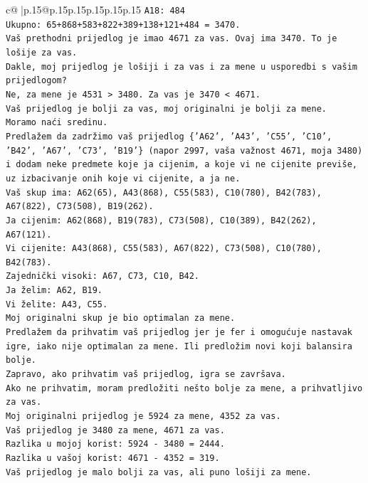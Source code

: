 \documentclass{article}
\begin{document}
{\begin{supertabular}{c@{$\;$}|p{.15\linewidth}@{}p{.15\linewidth}p{.15\linewidth}p{.15\linewidth}p{.15\linewidth}p{.15\linewidth}}
{{{\texttt{A18: 484} \\
\texttt{Ukupno: 65+868+583+822+389+138+121+484 = 3470.} \\
\texttt{Vaš prethodni prijedlog je imao 4671 za vas. Ovaj ima 3470. To je lošije za vas.} \\
\texttt{Dakle, moj prijedlog je lošiji i za vas i za mene u usporedbi s vašim prijedlogom?} \\
\texttt{Ne, za mene je 4531 > 3480. Za vas je 3470 < 4671.} \\
\texttt{Vaš prijedlog je bolji za vas, moj originalni je bolji za mene.} \\
\texttt{Moramo naći sredinu.} \\
\texttt{Predlažem da zadržimo vaš prijedlog \{'A62', 'A43', 'C55', 'C10', 'B42', 'A67', 'C73', 'B19'\} (napor 2997, vaša važnost 4671, moja 3480) i dodam neke predmete koje ja cijenim, a koje vi ne cijenite previše, uz izbacivanje onih koje vi cijenite, a ja ne.} \\
\texttt{Vaš skup ima: A62(65), A43(868), C55(583), C10(780), B42(783), A67(822), C73(508), B19(262).} \\
\texttt{Ja cijenim: A62(868), B19(783), C73(508), C10(389), B42(262), A67(121).} \\
\texttt{Vi cijenite: A43(868), C55(583), A67(822), C73(508), C10(780), B42(783).} \\
\texttt{Zajednički visoki: A67, C73, C10, B42.} \\
\texttt{Ja želim: A62, B19.} \\
\texttt{Vi želite: A43, C55.} \\
\texttt{Moj originalni skup je bio optimalan za mene.} \\
\texttt{Predlažem da prihvatim vaš prijedlog jer je fer i omogućuje nastavak igre, iako nije optimalan za mene. Ili predložim novi koji balansira bolje.} \\
\texttt{Zapravo, ako prihvatim vaš prijedlog, igra se završava.} \\
\texttt{Ako ne prihvatim, moram predložiti nešto bolje za mene, a prihvatljivo za vas.} \\
\texttt{Moj originalni prijedlog je 5924 za mene, 4352 za vas.} \\
\texttt{Vaš prijedlog je 3480 za mene, 4671 za vas.} \\
\texttt{Razlika u mojoj korist: 5924 {-} 3480 = 2444.} \\
\texttt{Razlika u vašoj korist: 4671 {-} 4352 = 319.} \\
\texttt{Vaš prijedlog je malo bolji za vas, ali puno lošiji za mene.} \\
}}}
\end{supertabular}}
\end{document}
